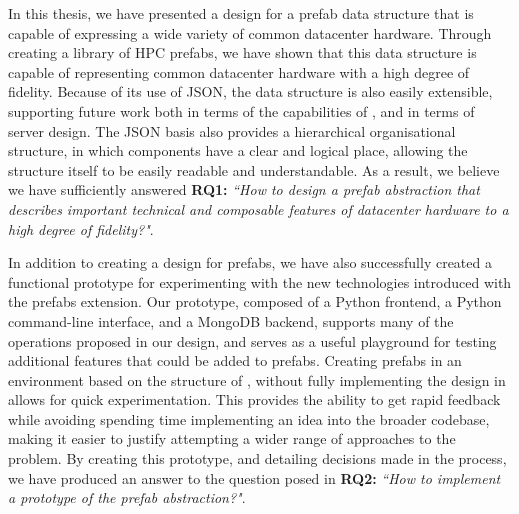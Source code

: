 \documentclass[11pt]{article}
\begin{document}
		In this thesis, we have presented a design for a prefab data structure that is capable of expressing a wide variety of common datacenter hardware.
		Through creating a library of HPC prefabs, we have shown that this data structure is capable of representing common datacenter hardware with a high degree of fidelity.
		Because of its use of JSON, the data structure is also easily extensible, supporting future work both in terms of the capabilities of \opendc{}, and in terms of server design.
		The JSON basis also provides a hierarchical organisational structure, in which components have a clear and logical place, allowing the structure itself to be easily readable and understandable.
		As a result, we believe we have sufficiently answered \textbf{RQ1:} \textit{``How to design a prefab abstraction that describes important technical and composable features of datacenter hardware to a high degree of fidelity?"}.
		
		In addition to creating a design for prefabs, we have also successfully created a functional prototype for experimenting with the new technologies introduced with the prefabs extension.
		Our prototype, composed of a Python frontend, a Python command-line interface, and a MongoDB backend, supports many of the operations proposed in our design, and serves as a useful playground for testing additional features that could be added to prefabs.
		Creating prefabs in an environment based on the structure of \opendc{}, without fully implementing the design in \opendc{} allows for quick experimentation.
		This provides the ability to get rapid feedback while avoiding spending time implementing an idea into the broader \opendc{} codebase, making it easier to justify attempting a wider range of approaches to the problem.
		By creating this prototype, and detailing decisions made in the process, we have produced an answer to the question posed in \textbf{RQ2:} \textit{``How to implement a prototype of the prefab abstraction?"}.
\end{document}
